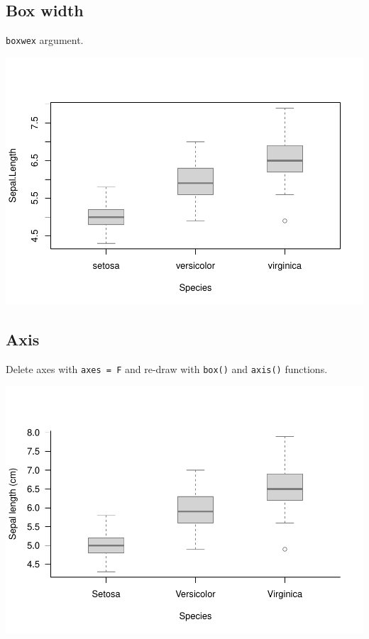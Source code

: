 \documentclass[
]{book}
\begin{document}
\hypertarget{box-width}{%
\subsection{Box width}\label{box-width}}

\texttt{boxwex} argument.

\includegraphics{_main_files/figure-latex/unnamed-chunk-33-1.pdf}

\hypertarget{axis-1}{%
\subsection{Axis}\label{axis-1}}

Delete axes with \texttt{axes\ =\ F} and re-draw with \texttt{box()} and \texttt{axis()} functions.

\includegraphics{_main_files/figure-latex/unnamed-chunk-34-1.pdf}
\end{document}
